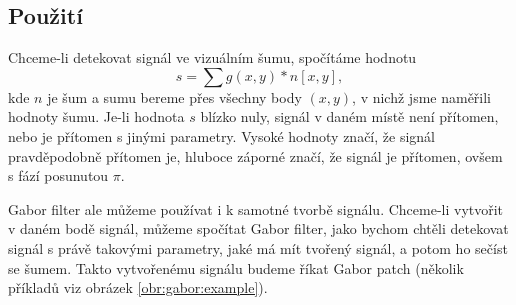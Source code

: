 \subsection{Použití}

Chceme-li detekovat signál ve vizuálním šumu, spočítáme hodnotu $$s=\sum
g(x,y)*n[x,y],$$ kde $n$ je šum a sumu bereme přes všechny body $(x,y)$, v
nichž jsme naměřili hodnoty šumu. Je-li hodnota $s$  blízko nuly, signál v
daném místě není přítomen, nebo je přítomen s jinými parametry. Vysoké hodnoty
značí, že
signál pravděpodobně přítomen je, hluboce záporné značí, že signál je přítomen,
ovšem s fází posunutou $\pi$.

Gabor filter ale můžeme používat i k samotné tvorbě signálu. Chceme-li vytvořit
v daném bodě signál, můžeme spočítat Gabor filter, jako bychom chtěli
detekovat signál s právě takovými parametry, jaké má mít tvořený signál, a
potom ho sečíst se šumem. Takto vytvořenému signálu budeme říkat Gabor patch (několik příkladů viz obrázek \ref{obr:gabor:example}).

